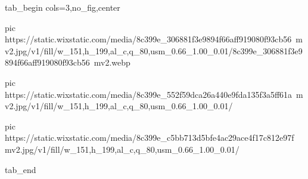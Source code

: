  
 
 
 
 


\ifcmt
  tab_begin cols=3,no_fig,center

     pic https://static.wixstatic.com/media/8c399e_306881f3e9894f66aff919080f93cb56~mv2.jpg/v1/fill/w_151,h_199,al_c,q_80,usm_0.66_1.00_0.01/8c399e_306881f3e9894f66aff919080f93cb56~mv2.webp

		 pic https://static.wixstatic.com/media/8c399e_552f59dca26a440e9fda135f3a5ff61a~mv2.jpg/v1/fill/w_151,h_199,al_c,q_80,usm_0.66_1.00_0.01/%

		 pic https://static.wixstatic.com/media/8c399e_c5bb713d5bfe4ac29ace4f17c812e97f~mv2.jpg/v1/fill/w_151,h_199,al_c,q_80,usm_0.66_1.00_0.01/%

  tab_end
\fi
